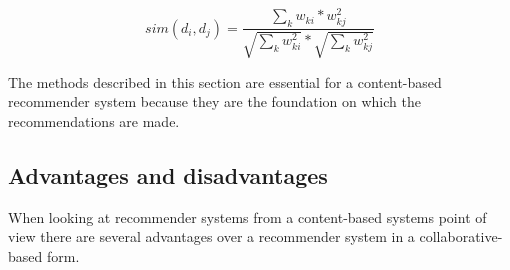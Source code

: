 \[
	sim({d_{i},d_{j}}) = \frac{\sum_{k}w_{ki}*w_{kj}^2}{\sqrt{\sum_{k}w_{ki}^2}*\sqrt{\sum_{k}w_{kj}^2}}
\]



The methods described in this section are essential for a content-based recommender system because they are the foundation on which the recommendations are made.

\subsection{Advantages and disadvantages}
When looking at recommender systems from a content-based systems point of view there are several advantages over a recommender system in a collaborative-based form.\newline

